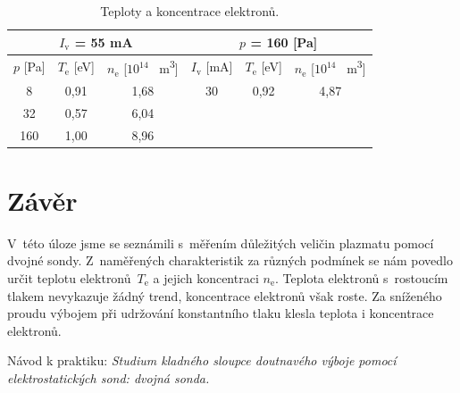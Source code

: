 \documentclass[a4paper,12pt]{article}
\begin{document}
\newpage
\begin{center}
	\begin{table}[h!]
		\centering
		\caption{Teploty a koncentrace elektronů.}
		\label{tab1}
		\begin{tabular}{|c|c|c|c|c|c|} \hline
			\multicolumn{3}{|c|}{$I_\text{v}$ = 55 \si{\milli\ampere}}& \multicolumn{3}{c|}{$p$ = 160 [\si{\pascal}] }  \\ \hline
			$p$ [\si{\pascal}] & $T_\text{e}$ [\si{\electronvolt}]  & $n_\text{e}$ [$10^{14}$ \si{\per\meter\cubed}]& $I_\text{v}$ [\si{\milli\ampere}] & $T_\text{e}$ [\si{\electronvolt}] & $n_\text{e}$  [$10^{14}$ \si{\per\meter\cubed}]\\ \hline
			8 & 0,91 & 1,68 & 30 & 0,92 & 4,87\\ \hline
			32 & 0,57 & 6,04 &  &  &  \\ \hline
			160 & 1,00 & 8,96 &  &  &  \\ \hline
			
		\end{tabular}
	\end{table}
\end{center}

\newpage
\section{Závěr}
V~této úloze jsme se seznámili s~měřením důležitých veličin plazmatu pomocí dvojné sondy.
Z~naměřených charakteristik za různých podmínek se nám povedlo určit teplotu
elektronů~$T_\text{e}$ a jejich koncentraci $n_\text{e}$. Teplota elektronů s~rostoucím tlakem
nevykazuje žádný trend, koncentrace elektronů však roste. Za sníženého proudu výbojem
při udržování konstantního tlaku klesla teplota i koncentrace elektronů.

\newpage
\begin{thebibliography}{10}
	 Návod k praktiku: \textit{Studium kladného sloupce doutnavého výboje pomocí elektrostatických sond: dvojná sonda.}
	
\end{thebibliography}
\end{document}
